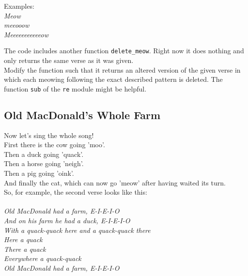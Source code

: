 \noindent Examples:\\
\textit{Meow\\
meeooow\\
Meeeeeeeeeeeow\\}

\noindent The code includes another function  \texttt{delete\_meow}. Right now it does nothing and only returns the same verse as it was given.\\
Modify the function such that it returns an altered version of the given verse in which each meowing following the exact described pattern is deleted. The function \texttt{sub} of the \texttt{re} module might be helpful.

\cprotect{}

\subsection{Old MacDonald's Whole Farm}
Now let's sing the whole song!\\
First there is the cow going 'moo'.\\
Then a duck going 'quack'.\\
Then a horse going 'neigh'.\\
Then a pig going 'oink'.\\
And finally the cat, which can now go 'meow' after having waited its turn.\\
So, for example, the second verse looks like this:\\\\
\textit{
Old MacDonald had a farm, E-I-E-I-O\\
And on his farm he had a duck, E-I-E-I-O\\
With a quack-quack here and a quack-quack there\\
Here a quack\\
There a quack\\
Everywhere a quack-quack\\
Old MacDonald had a farm, E-I-E-I-O\\
}

